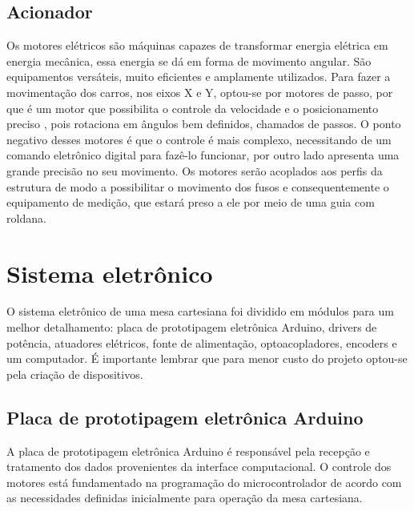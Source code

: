 \subsection{Acionador}\label{subsec:metacionador}

Os motores elétricos são máquinas capazes de transformar energia elétrica em energia mecânica, 
essa energia se dá em forma de movimento angular. São equipamentos versáteis, muito eficientes 
e amplamente utilizados. Para fazer a movimentação dos carros, nos eixos X e Y, optou-se por 
motores de passo, por que é um motor que possibilita o controle da velocidade e o posicionamento 
preciso , pois rotaciona em ângulos bem definidos, chamados de passos. O ponto negativo desses 
motores é que o controle é mais complexo, necessitando de um comando eletrônico digital para 
fazê-lo funcionar, por outro lado apresenta uma grande precisão no seu movimento. Os motores 
serão acoplados aos perfis da estrutura de modo a possibilitar o movimento dos fusos e consequentemente 
o equipamento de medição, que estará preso a ele por meio de uma guia com roldana. 

\section{Sistema eletrônico}\label{sec:metsisele}

O sistema eletrônico de uma mesa cartesiana foi dividido em módulos para um melhor detalhamento: 
placa de prototipagem eletrônica Arduino, drivers de potência, atuadores elétricos, fonte de alimentação, 
optoacopladores, encoders e um computador. É importante lembrar que para menor custo do projeto optou-se 
pela criação de dispositivos.

    
\subsection{Placa de prototipagem eletrônica Arduino}\label{subsec:metarduino}

A placa de prototipagem eletrônica Arduino é responsável pela recepção e tratamento dos dados provenientes 
da interface computacional. O controle dos motores está fundamentado na programação do microcontrolador 
de acordo com as necessidades definidas inicialmente para operação da mesa cartesiana.


